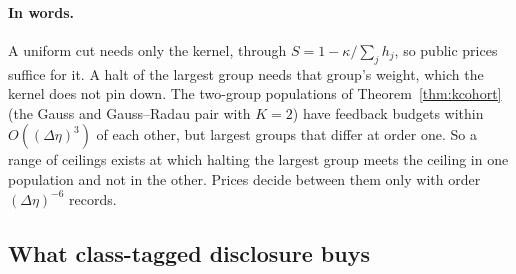 
\paragraph{In words.} A uniform cut needs only the kernel, through $S=1-\kappa/\sum_jh_j$, so public prices suffice for it. A halt of the largest group needs that group's weight, which the kernel does not pin down. The two-group populations of Theorem~\ref{thm:kcohort} (the Gauss and Gauss--Radau pair with $K=2$) have feedback budgets within $O((\Delta\eta)^3)$ of each other, but largest groups that differ at order one. So a range of ceilings exists at which halting the largest group meets the ceiling in one population and not in the other. Prices decide between them only with order $(\Delta\eta)^{-6}$ records.

\subsection{What class-tagged disclosure buys}

